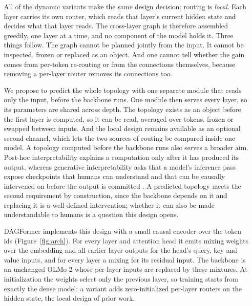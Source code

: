 \documentclass[11pt]{article}
\newcommand{\dagf}{DAGFormer}
\begin{document}
All of the dynamic variants make the same design decision: routing is \emph{local}. Each layer carries its own router, which reads that layer's current hidden state and decides what that layer reads. The cross-layer graph is therefore assembled greedily, one layer at a time, and no component of the model holds it. Three things follow. The graph cannot be planned jointly from the input. It cannot be inspected, frozen or replaced as an object. And one cannot tell whether the gain comes from per-token re-routing or from the connections themselves, because removing a per-layer router removes its connections too.

We propose to predict the whole topology with one separate module that reads only the input, before the backbone runs. One module then serves every layer, so its parameters are shared across depth. The topology exists as an object before the first layer is computed, so it can be read, averaged over tokens, frozen or swapped between inputs. And the local design remains available as an optional second channel, which lets the two sources of routing be compared inside one model. A topology computed before the backbone runs also serves a broader aim. Post-hoc interpretability explains a computation only after it has produced its output, whereas generative interpretability asks that a model's inference pass expose checkpoints that humans can understand and that can be causally intervened on before the output is committed \citep{yang2026generative}. A predicted topology meets the second requirement by construction, since the backbone depends on it and replacing it is a well-defined intervention; whether it can also be made understandable to humans is a question this design opens.

\dagf{} implements this design with a small causal encoder over the token ids (Figure~\ref{fig:arch}). For every layer and attention head it emits mixing weights over the embedding and all earlier layer outputs for the head's query, key and value inputs, and for every layer a mixing for its residual input. The backbone is an unchanged OLMo-2 \citep{olmo2} whose per-layer inputs are replaced by these mixtures. At initialization the weights select only the previous layer, so training starts from exactly the dense model; a variant adds zero-initialized per-layer routers on the hidden state, the local design of prior work.
\end{document}
